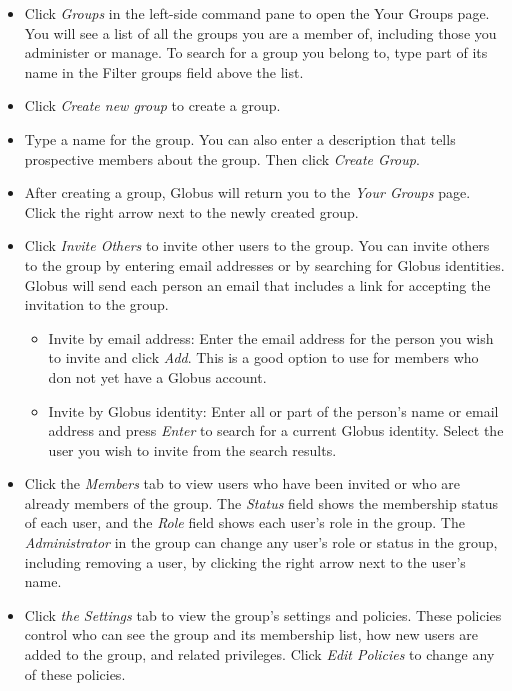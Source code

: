 \begin{itemize}
\item Click \emph{Groups} in the left-side command pane to open the Your Groups page. 
You will see a list of all the groups you are a member of, including those you 
administer or manage. To search for a group you belong to, type part of its name 
in the Filter groups field above the list.
\item Click \emph{Create new group} to create a group.
\item Type a name for the group. You can also enter a description that tells 
prospective members about the group. Then click \emph{Create Group}.
\item After creating a group, Globus will return you to the \emph{Your Groups} page. 
Click the right arrow next to the newly created group.
\item Click \emph{Invite Others} to invite other users to the group.
You can invite others to the group by entering email addresses or by searching 
for Globus identities. Globus will send each person an email that includes a link 
for accepting the invitation to the group.
\begin{itemize}
\item Invite by email address: Enter the email address for the person you wish to 
invite and click \emph{Add}. This is a good option to use for members who don not 
yet have a Globus account.
\item Invite by Globus identity: Enter all or part of the person's name or email 
address and press \emph{Enter} to search for a current Globus identity. Select 
the user you wish to invite from the search results.
\end{itemize}
\item Click the \emph{Members} tab to view users who have been invited or who 
are already members of the group. The \emph{Status} field shows the membership 
status of each user, and the \emph{Role} field shows each user's role in the group. 
The \emph{Administrator} in the group can change any user's role or status in the 
group, including removing a user, by clicking the right arrow next to the user's name.
\item Click \emph{the Settings} tab to view the group's settings and policies. 
These policies control who can see the group and its membership list, how new 
users are added to the group, and related privileges. Click \emph{Edit Policies} 
to change any of these policies.
\end{itemize}

